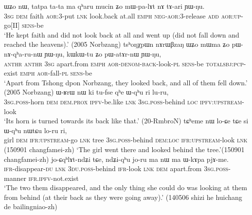 \begin{exe}
\ex \label{ex:qharu2}
\begin{xlist}[(ii)]
 \label{ex:qharu.mWpalAt}
\gll  ɯʑo nɯ, tatpa ta-ta ma qʰaru mucin ʑo mɯ-pa-lɤt nɤ tɤ-ari ɲɯ-ŋu. \\
\textsc{3sg} \textsc{dem} faith \textsc{aor}:3\flobv{}-put \textsc{lnk} look.back at.all \textsc{emph} \textsc{neg}-\textsc{aor}:3\flobv{}-release \textsc{add} \textsc{aor}:\textsc{up}-go[II] \textsc{sens}-be \\
\glt `He kept faith and did not look back at all and went up (did not fall down and reached the heavens).' (2005 Norbzang)
\gll  tsʰoŋχpɯn nɤrɯβzaŋ ɯʑo mɯma ʑo pɯ-nɤ-qʰa-ru-nɯ ɲɯ-ŋu, kɯ\redp{}kɯ-tu ʑo pɯ-atɤr-nɯ ɲɯ-ŋu, \\
\textsc{anthr}  \textsc{anthr} \textsc{3sg} apart.from \textsc{emph} \textsc{aor}-\textsc{denom}-\textsc{back}-look-\textsc{pl} \textsc{sens}-be \textsc{total}\redp{}\textsc{sbj}:\textsc{pcp}-exist \textsc{emph} \textsc{aor}-fall-\textsc{pl} \textsc{sens}-be \\
\glt `Apart from Tshong dpon Norbzang, they looked back, and all of them fell down.' (2005 Norbzang)
 \label{ex:Wqhu.luru}
\gll ɯ-ʁrɯ nɯ ki tu-fse qʰe  ɯ-qʰu ri lu-ru,  \\
\textsc{3sg}.\textsc{poss}-horn \textsc{dem} \textsc{dem}.\textsc{prox} \textsc{ipfv}-be.like \textsc{lnk} \textsc{3sg}.\textsc{poss}-behind \textsc{loc} \textsc{ipfv}:\textsc{upstream}-look \\
\glt `Its horn is turned towards its back like that.' (20-RmbroN) 
 \label{ex:si.Wqhu.loru}
\gll tɕʰeme nɯ lo-ɕe tɕe si ɯ-qʰu nɯtɕu lo-ru ri, \\
girl \textsc{dem} \textsc{ifr}:\textsc{upstream}-go \textsc{lnk} tree \textsc{3sg}.\textsc{poss}-behind \textsc{dem}:\textsc{loc} \textsc{ifr}:\textsc{upstream}-look \textsc{lnk} \\
\glt (150901 changfamei-zh)
\glt `The girl went there and looked behind the tree.'(150901 changfamei-zh)
 \label{ex:ndZiqhu.koru}
\gll jo-ɕqʰlɤt-ndʑi tɕe, ndʑi-qʰu jo-ru ma nɯ ma ɯ-kɤpa pjɤ-me. \\
\textsc{ifr}-disappear-\textsc{du} \textsc{lnk} \textsc{3du}.\textsc{poss}-behind \textsc{ifr}-look \textsc{lnk} \textsc{dem} apart.from \textsc{3sg}.\textsc{poss}-manner \textsc{ifr}.\textsc{ipfv}-not.exist \\
\glt `The two them disappeared, and the only thing she could do was looking at them from behind (at their back as they were going away).' (140506 shizi he huichang de bailingniao-zh)
\end{xlist}
\end{exe}

